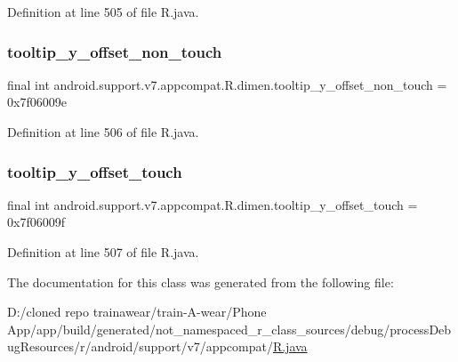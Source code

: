Definition at line 505 of file R.\+java.

\mbox{\label{classandroid_1_1support_1_1v7_1_1appcompat_1_1_r_1_1dimen_ac3ddf695b8b86c3ab7c1605b1f1e727c}} 
\subsubsection{\texorpdfstring{tooltip\_y\_offset\_non\_touch}{tooltip\_y\_offset\_non\_touch}}
{\footnotesize\ttfamily final int android.\+support.\+v7.\+appcompat.\+R.\+dimen.\+tooltip\+\_\+y\+\_\+offset\+\_\+non\+\_\+touch = 0x7f06009e\hspace{0.3cm}{\ttfamily [static]}}



Definition at line 506 of file R.\+java.

\mbox{\label{classandroid_1_1support_1_1v7_1_1appcompat_1_1_r_1_1dimen_af398f083a7bf2c5553c7f9f8e66f2cdc}} 
\subsubsection{\texorpdfstring{tooltip\_y\_offset\_touch}{tooltip\_y\_offset\_touch}}
{\footnotesize\ttfamily final int android.\+support.\+v7.\+appcompat.\+R.\+dimen.\+tooltip\+\_\+y\+\_\+offset\+\_\+touch = 0x7f06009f\hspace{0.3cm}{\ttfamily [static]}}



Definition at line 507 of file R.\+java.



The documentation for this class was generated from the following file\+:\begin{DoxyCompactItemize}
\item 
D\+:/cloned repo trainawear/train-\/\+A-\/wear/\+Phone App/app/build/generated/not\+\_\+namespaced\+\_\+r\+\_\+class\+\_\+sources/debug/process\+Debug\+Resources/r/android/support/v7/appcompat/\mbox{\hyperlink{process_debug_resources_2r_2android_2support_2v7_2appcompat_2_r_8java}{R.\+java}}\end{DoxyCompactItemize}
